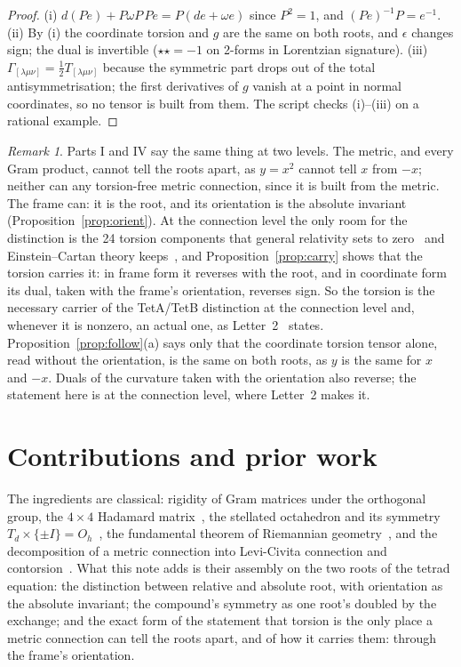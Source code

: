 \documentclass[twocolumn]{iopjournal}
\theoremstyle{definition}
\theoremstyle{remark}
\newtheorem*{remark}{Remark}
\begin{document}
\begin{proof}
(i) $d(Pe) + P\omega P\,Pe = P(de + \omega e)$ since $P^2 = 1$, and
$(Pe)^{-1}P = e^{-1}$. (ii) By (i) the coordinate torsion and $g$ are
the same on both roots, and $\epsilon$ changes sign; the dual is
invertible ($\star\star = -1$ on 2-forms in Lorentzian signature).
(iii) $\Gamma_{[\lambda\mu\nu]} = \tfrac12 T_{[\lambda\mu\nu]}$
because the symmetric part drops out of the total antisymmetrisation;
the first derivatives of $g$ vanish at a point in normal coordinates,
so no tensor is built from them. The script checks (i)--(iii) on a
rational example.
\end{proof}

\begin{remark}
Parts I and IV say the same thing at two levels. The metric, and
every Gram product, cannot tell the roots apart, as $y = x^2$ cannot
tell $x$ from $-x$; neither can any torsion-free metric connection,
since it is built from the metric. The frame can: it is the root, and
its orientation is the absolute invariant
(Proposition~\ref{prop:orient}). At the connection level the only room
for the distinction is the 24 torsion components that general
relativity sets to zero~\cite{LeviCivita1917} and Einstein--Cartan
theory keeps~\cite{Cartan1922,Hehl1976}, and
Proposition~\ref{prop:carry} shows that the torsion carries it: in
frame form it reverses with the root, and in coordinate form its dual,
taken with the frame's orientation, reverses sign. So the torsion is
the necessary carrier of the TetA/TetB distinction at the connection
level and, whenever it is nonzero, an actual one, as
Letter~2~\cite{NelsonLetter2,NelsonTorsion} states.
Proposition~\ref{prop:follow}(a) says only that the coordinate torsion
tensor alone, read without the orientation, is the same on both roots,
as $y$ is the same for $x$ and $-x$. Duals of the curvature taken with
the orientation also reverse; the statement here is at the connection
level, where Letter~2 makes it.
\end{remark}


\section*{Contributions and prior work}

The ingredients are classical: rigidity of Gram matrices under the
orthogonal group, the $4\times4$ Hadamard
matrix~\cite{Sylvester1867}, the stellated octahedron and its
symmetry $T_d \times \{\pm I\} = O_h$~\cite{Coxeter1973}, the
fundamental theorem of Riemannian geometry~\cite{LeviCivita1917},
and the decomposition of a metric connection into Levi-Civita
connection and contorsion~\cite{Hehl1976}. What this note adds is
their assembly on the two roots of the tetrad equation: the
distinction between relative and absolute root, with orientation as
the absolute invariant; the compound's symmetry as one root's
doubled by the exchange; and the exact form of the statement that
torsion is the only place a metric connection can tell the roots
apart, and of how it carries them: through the frame's orientation.
\end{document}
